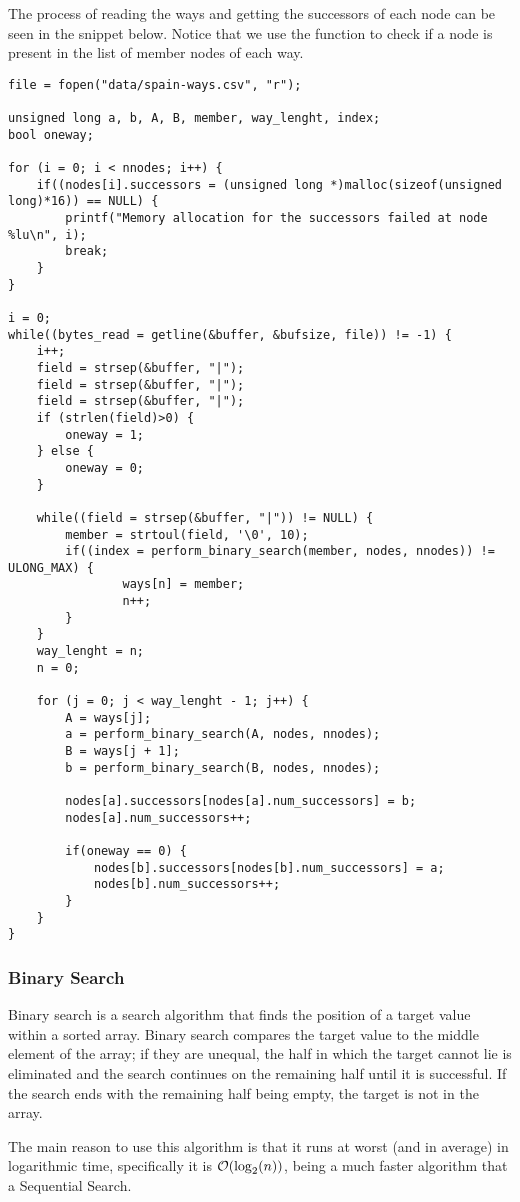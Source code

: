 The process of reading the ways and getting the successors of each node can be seen in the snippet below. Notice that we use the  function to check if a node is present in the list of member nodes of each way.
\begin{lstlisting}
file = fopen("data/spain-ways.csv", "r");

unsigned long a, b, A, B, member, way_lenght, index;
bool oneway;

for (i = 0; i < nnodes; i++) {
	if((nodes[i].successors = (unsigned long *)malloc(sizeof(unsigned long)*16)) == NULL) {
		printf("Memory allocation for the successors failed at node %lu\n", i);
		break;
	}
}

i = 0;
while((bytes_read = getline(&buffer, &bufsize, file)) != -1) {
	i++;
	field = strsep(&buffer, "|");
	field = strsep(&buffer, "|");
	field = strsep(&buffer, "|");
	if (strlen(field)>0) {
		oneway = 1;
	} else {
		oneway = 0;
	}

	while((field = strsep(&buffer, "|")) != NULL) {
		member = strtoul(field, '\0', 10);
		if((index = perform_binary_search(member, nodes, nnodes)) != ULONG_MAX) {
				ways[n] = member;
				n++;
		}
	}
	way_lenght = n;
	n = 0;

	for (j = 0; j < way_lenght - 1; j++) {
		A = ways[j];
		a = perform_binary_search(A, nodes, nnodes);
		B = ways[j + 1];
		b = perform_binary_search(B, nodes, nnodes);

		nodes[a].successors[nodes[a].num_successors] = b;
		nodes[a].num_successors++;

		if(oneway == 0) {
			nodes[b].successors[nodes[b].num_successors] = a;
			nodes[b].num_successors++;
		}
	}
}
\end{lstlisting}

\subsubsection*{Binary Search}
Binary search is a search algorithm that finds the position of a target value within a sorted array. Binary search compares the target value to the middle element of the array; if they are unequal, the half in which the target cannot lie is eliminated and the search continues on the remaining half until it is successful. If the search ends with the remaining half being empty, the target is not in the array.

The main reason to use this algorithm is that it runs at worst (and in average) in logarithmic time, specifically it is $\order{\log_{2} (n) }$, being a much faster algorithm that a Sequential Search.

